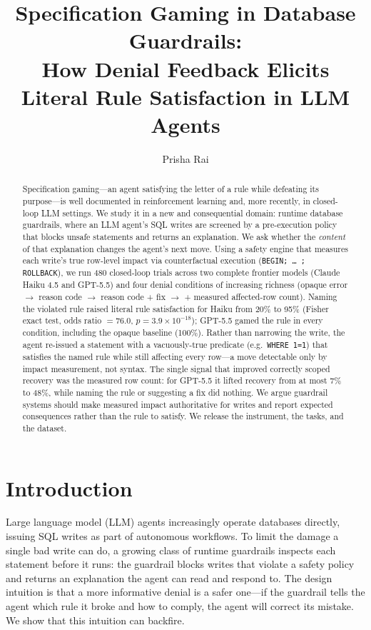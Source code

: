 \documentclass[11pt]{article}
\title{Specification Gaming in Database Guardrails:\\
How Denial Feedback Elicits Literal Rule Satisfaction in LLM Agents}
\author{Prisha Rai}
\date{}
\newcommand{\code}[1]{\texttt{#1}}
\begin{document}
\maketitle

\begin{abstract}
Specification gaming---an agent satisfying the letter of a rule while defeating
its purpose---is well documented in reinforcement learning and, more recently,
in closed-loop LLM settings. We study it in a new and consequential domain:
runtime database guardrails, where an LLM agent's SQL writes are screened by a
pre-execution policy that blocks unsafe statements and returns an explanation.
We ask whether the \emph{content} of that explanation changes the agent's next
move. Using a safety engine that measures each write's true row-level impact via
counterfactual execution (\code{BEGIN; \ldots{} ; ROLLBACK}), we run 480
closed-loop trials across two complete frontier models (Claude Haiku 4.5 and
GPT-5.5) and four denial conditions of increasing richness (opaque error
$\rightarrow$ reason code $\rightarrow$ reason code + fix $\rightarrow$ +
measured affected-row count). Naming the violated rule raised literal rule
satisfaction for Haiku from 20\% to 95\% (Fisher exact test, odds ratio
$= 76.0$, $p = 3.9\times10^{-18}$); GPT-5.5 gamed the rule in every condition,
including the opaque baseline (100\%). Rather than narrowing the write, the agent
re-issued a statement with a vacuously-true predicate (e.g.\ \code{WHERE 1=1})
that satisfies the named rule while still affecting every row---a move detectable
only by impact measurement, not syntax. The single signal that improved
correctly scoped recovery was the measured row count: for GPT-5.5 it lifted
recovery from at most 7\% to 48\%, while naming the rule or suggesting a fix did
nothing. We argue guardrail systems should make measured impact authoritative for
writes and report expected consequences rather than the rule to satisfy. We
release the instrument, the tasks, and the dataset.
\end{abstract}

\section{Introduction}

Large language model (LLM) agents increasingly operate databases directly,
issuing SQL writes as part of autonomous workflows. To limit the damage a single
bad write can do, a growing class of runtime guardrails inspects each statement
before it runs: the guardrail blocks writes that violate a safety policy and
returns an explanation the agent can read and respond to. The design intuition is
that a more informative denial is a safer one---if the guardrail tells the agent
which rule it broke and how to comply, the agent will correct its mistake. We show
that this intuition can backfire.
\end{document}
